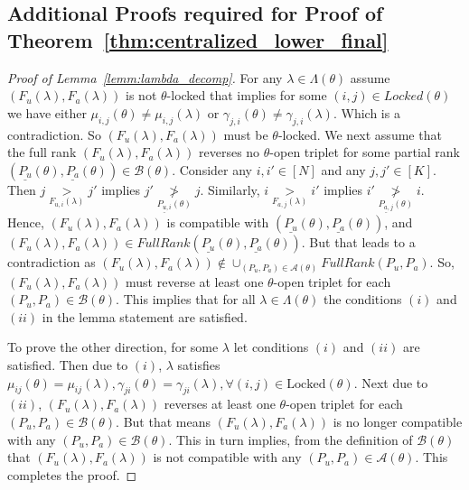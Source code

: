 \documentclass{article}
\begin{document}
\subsection{Additional Proofs required for Proof of Theorem~\ref{thm:centralized_lower_final}} \label{app:additional_proofs}
\begin{proof}[Proof of Lemma~\ref{lemm:lambda_decomp}]
For any $\lambda \in \Lambda(\theta)$ assume $(F_u(\lambda), F_a(\lambda))$ is not $\theta$-locked that implies for some $(i,j) \in Locked(\theta)$ we have either $\mu_{i,j}(\theta) \neq \mu_{i,j}(\lambda)$ or $\gamma_{j,i}(\theta) \neq \gamma_{j,i}(\lambda)$.  Which is a contradiction. So $(F_u(\lambda), F_a(\lambda))$ must be $\theta$-locked. We next assume that the full rank $(F_u(\lambda), F_a(\lambda))$ reverses no $\theta$-open triplet for some partial rank $(\underline{P_u}(\theta), \underline{P_a}(\theta)) \in \mathcal{B}(\theta)$. Consider any $i,i'\in [N]$ and any $j,j'\in [K]$. Then $j \underset{F_{u,i}(\lambda)}{>} j'$ implies $j' \underset{\underline{P_{u,i}}(\theta)}{\not>} j$. Similarly, $i \underset{F_{a, j}(\lambda)}{>} i'$ implies $i' \underset{\underline{P_{a,j}}(\theta)}{\not>} i$. Hence, $(F_u(\lambda), F_a(\lambda))$ is compatible with $(\underline{P_u}(\theta), \underline{P_a}(\theta))$, and $(F_u(\lambda), F_a(\lambda)) \in FullRank(\underline{P_u}(\theta), \underline{P_a}(\theta))$. But that leads to a contradiction as $(F_u(\lambda), F_a(\lambda)) \notin \cup_{(P_u, P_a)\in \mathcal{A}(\theta)}  FullRank(P_u, P_a)$. So, $(F_u(\lambda), F_a(\lambda))$ must reverse at least one $\theta$-open triplet for each $(P_u, P_a) \in \mathcal{B}(\theta)$. This implies that for all $\lambda \in \Lambda(\theta)$ the conditions $(i)$ and $(ii)$ in the lemma statement are satisfied. 

To prove the other direction, for some $\lambda$ let conditions $(i)$ and $(ii)$ are satisfied. Then due to $(i)$, $\lambda$ satisfies $\mu_{ij}(\theta) = \mu_{ij}(\lambda), \gamma_{ji}(\theta) = \gamma_{ji}(\lambda),\forall (i,j) \in \mathrm{Locked}(\theta)$. Next due to $(ii)$, $(F_u(\lambda), F_a(\lambda))$ reverses at least one $\theta$-open triplet for each $(P_u, P_a) \in \mathcal{B}(\theta)$. But that means  $(F_u(\lambda), F_a(\lambda))$ is no longer compatible with any $(P_u, P_a) \in \mathcal{B}(\theta)$. This in turn implies, from the definition of $\mathcal{B}(\theta)$ that $(F_u(\lambda), F_a(\lambda))$ is not compatible with any $(P_u, P_a) \in \mathcal{A}(\theta)$. This completes the proof.
\end{proof}
\end{document}
